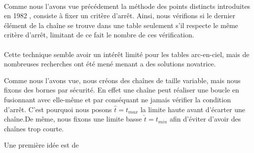 \paragraph{}Comme nous l'avons vue précédement la méthode des points distincts introduites en 1982 \cite{Rivest}, consiste à fixer un critère d'arrêt. Ainsi, nous vérifions si le dernier élément de la chaîne se trouve dans une table seulement s'il respecte le même critère d'arrêt, limitant de ce fait le nombre de ces vérification.

\paragraph{}Cette technique semble avoir un intérêt limité pour les tables arc-en-ciel, mais de nombreuses recherches ont été mené menant a des solutions novatrice.

\pargraph{}Comme nous l'avons vue, nous créons des chaînes de taille variable, mais nous fixons des bornes par sécurité. En effet une chaîne peut réaliser une boucle en fusionnant avec elle-même et par conséquant ne jamais vérifier la condition d'arrêt. C'est pourquoi nous posons $\hat{t}=t_{max}$ la limite haute avant d'écarter une chaîne.De même, nous fixons une limite basse $\check{t}=t_{min}$ afin d'éviter d'avoir des chaînes trop courte.

	Une première idée est de 
	
\endinput{}
